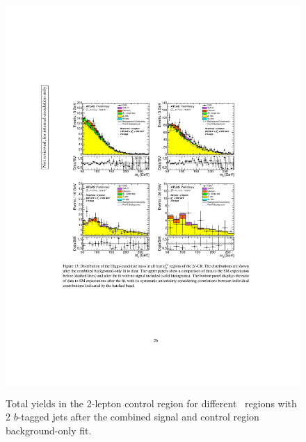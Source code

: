 \begin{figure}[!htb]
    \includegraphics[width=15cm,height=15cm, trim={4cm 9cm 4cm 6cm}, clip]{chapters/c9/figures/post-fit-2lep.pdf}
  \caption{Total yields in the 2-lepton control region for different \met~regions with \\2 $b$-tagged jets after the combined signal and control region background-only fit.}
  \label{fig:Data_MC_CR2_ll_m_jj_2b_postfit}
\end{figure}

